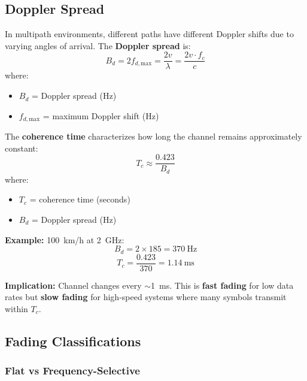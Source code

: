 \subsection{Doppler Spread}

In multipath environments, different paths have different Doppler shifts due to varying angles of arrival. The \textbf{Doppler spread} is:
\begin{equation}
B_d = 2f_{d,\text{max}} = \frac{2v}{\lambda} = \frac{2v \cdot f_c}{c}
\end{equation}
where:
\begin{itemize}
\item $B_d$ = Doppler spread (Hz)
\item $f_{d,\text{max}}$ = maximum Doppler shift (Hz)
\end{itemize}

The \textbf{coherence time} characterizes how long the channel remains approximately constant:
\begin{equation}
T_c \approx \frac{0.423}{B_d}
\end{equation}
where:
\begin{itemize}
\item $T_c$ = coherence time (seconds)
\item $B_d$ = Doppler spread (Hz)
\end{itemize}

\textbf{Example:} 100~km/h at 2~GHz:
\begin{equation}
B_d = 2 \times 185 = 370~\text{Hz}
\end{equation}
\begin{equation}
T_c = \frac{0.423}{370} = 1.14~\text{ms}
\end{equation}

\textbf{Implication:} Channel changes every $\sim$1~ms. This is \textbf{fast fading} for low data rates but \textbf{slow fading} for high-speed systems where many symbols transmit within $T_c$.

\subsection{Fading Classifications}\label{fading-classifications}

\subsubsection{Flat vs
Frequency-Selective}\label{flat-vs-frequency-selective}

